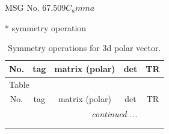 \documentclass[fleqn,8pt]{jsarticle}
\begin{document}
\setcounter{MaxMatrixCols}{32}

\renewcommand{\tablename}{Table~}
\renewcommand{\figurename}{Figure~}
\begin{center}
\LARGE
MSG No. 67.509\quad$C_{a}mma$
\end{center}
* symmetry operation
\renewcommand{\arraystretch}{1.3}
\begin{longtable}{ccccc}
\caption{Symmetry operations for 3d polar vector.}
 \\
 \hline \hline
No. & tag & matrix (polar) & det & TR \\ \hline \endfirsthead

\multicolumn{4}{l}{\tablename\ \thetable{}} \\
 \hline \hline
No. & tag & matrix (polar) & det & TR \\ \hline \endhead

 \hline \hline
\multicolumn{4}{r}{\footnotesize\it continued ...} \\ \endfoot

 \hline \hline
\multicolumn{4}{r}{} \\ \endlastfoot


\end{longtable}
\end{document}
